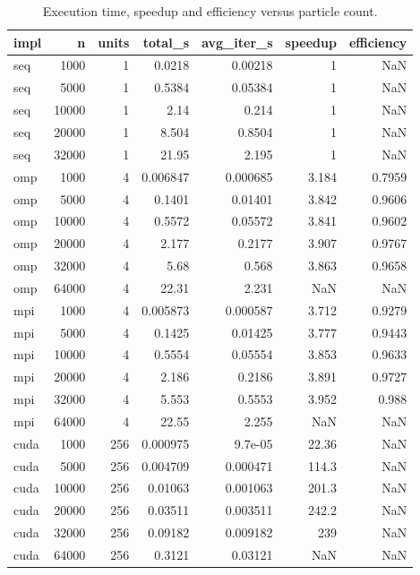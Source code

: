 \begin{table}
\caption{Execution time, speedup and efficiency versus particle count.}
\label{tab:size}
\begin{tabular}{lrrrrrr}
\toprule
impl & n & units & total\_s & avg\_iter\_s & speedup & efficiency \\
\midrule
seq & 1000 & 1 & 0.0218 & 0.00218 & 1 & NaN \\
seq & 5000 & 1 & 0.5384 & 0.05384 & 1 & NaN \\
seq & 10000 & 1 & 2.14 & 0.214 & 1 & NaN \\
seq & 20000 & 1 & 8.504 & 0.8504 & 1 & NaN \\
seq & 32000 & 1 & 21.95 & 2.195 & 1 & NaN \\
omp & 1000 & 4 & 0.006847 & 0.000685 & 3.184 & 0.7959 \\
omp & 5000 & 4 & 0.1401 & 0.01401 & 3.842 & 0.9606 \\
omp & 10000 & 4 & 0.5572 & 0.05572 & 3.841 & 0.9602 \\
omp & 20000 & 4 & 2.177 & 0.2177 & 3.907 & 0.9767 \\
omp & 32000 & 4 & 5.68 & 0.568 & 3.863 & 0.9658 \\
omp & 64000 & 4 & 22.31 & 2.231 & NaN & NaN \\
mpi & 1000 & 4 & 0.005873 & 0.000587 & 3.712 & 0.9279 \\
mpi & 5000 & 4 & 0.1425 & 0.01425 & 3.777 & 0.9443 \\
mpi & 10000 & 4 & 0.5554 & 0.05554 & 3.853 & 0.9633 \\
mpi & 20000 & 4 & 2.186 & 0.2186 & 3.891 & 0.9727 \\
mpi & 32000 & 4 & 5.553 & 0.5553 & 3.952 & 0.988 \\
mpi & 64000 & 4 & 22.55 & 2.255 & NaN & NaN \\
cuda & 1000 & 256 & 0.000975 & 9.7e-05 & 22.36 & NaN \\
cuda & 5000 & 256 & 0.004709 & 0.000471 & 114.3 & NaN \\
cuda & 10000 & 256 & 0.01063 & 0.001063 & 201.3 & NaN \\
cuda & 20000 & 256 & 0.03511 & 0.003511 & 242.2 & NaN \\
cuda & 32000 & 256 & 0.09182 & 0.009182 & 239 & NaN \\
cuda & 64000 & 256 & 0.3121 & 0.03121 & NaN & NaN \\
\bottomrule
\end{tabular}
\end{table}
